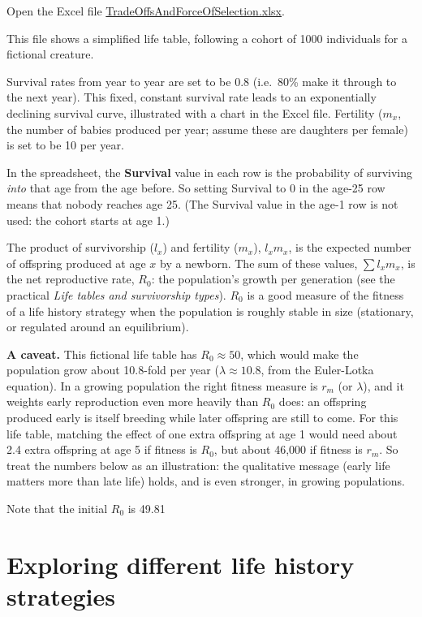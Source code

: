 \documentclass[
  a4paper]{book}
\begin{document}
Open the Excel file \href{https://www.dropbox.com/scl/fi/972ie76xj7nb9ni61n6ry/Trade_Offs_And_Force_Of_Selection.xlsx?rlkey=jmnpi05n8dicpqt3z8b0hbjhw&dl=0}{TradeOffsAndForceOfSelection.xlsx}.

This file shows a simplified life table, following a cohort of 1000 individuals for a fictional creature.

Survival rates from year to year are set to be 0.8 (i.e.~80\% make it through to the next year). This fixed, constant survival rate leads to an exponentially declining survival curve, illustrated with a chart in the Excel file. Fertility (\(m_x\), the number of babies produced per year; assume these are daughters per female) is set to be 10 per year.

In the spreadsheet, the \textbf{Survival} value in each row is the probability of surviving \emph{into} that age from the age before. So setting Survival to 0 in the age-25 row means that nobody reaches age 25. (The Survival value in the age-1 row is not used: the cohort starts at age 1.)

The product of survivorship (\(l_x\)) and fertility (\(m_x\)), \(l_x m_x\), is the expected number of offspring produced at age \(x\) by a newborn. The sum of these values, \(\sum l_x m_x\), is the net reproductive rate, \(R_0\): the population's growth per generation (see the practical \emph{Life tables and survivorship types}). \(R_0\) is a good measure of the fitness of a life history strategy when the population is roughly stable in size (stationary, or regulated around an equilibrium).

\textbf{A caveat.} This fictional life table has \(R_0 \approx 50\), which would make the population grow about 10.8-fold per year (\(\lambda \approx 10.8\), from the Euler-Lotka equation). In a growing population the right fitness measure is \(r_m\) (or \(\lambda\)), and it weights early reproduction even more heavily than \(R_0\) does: an offspring produced early is itself breeding while later offspring are still to come. For this life table, matching the effect of one extra offspring at age 1 would need about 2.4 extra offspring at age 5 if fitness is \(R_0\), but about 46,000 if fitness is \(r_m\). So treat the numbers below as an illustration: the qualitative message (early life matters more than late life) holds, and is even stronger, in growing populations.

Note that the initial \(R_0\) is 49.81

\section{Exploring different life history strategies}\label{exploring-different-life-history-strategies}
\end{document}
